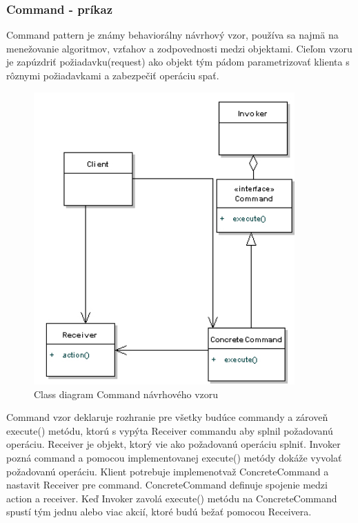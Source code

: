 \subsubsection{Command - príkaz}
\indent Command pattern je známy behaviorálny návrhový vzor, používa sa najmä na menežovanie algoritmov, vzťahov a zodpovednosti medzi objektami. 
Cieľom vzoru je zapúzdriť požiadavku(request) ako objekt tým pádom parametrizovať klienta s rôznymi požiadavkami a zabezpečiť operáciu spať.\cite{designpattern}
\begin{figure}[!htbp]
	\centering
	\includegraphics[width=10cm]{img/command_pattern_class.jpg}
	\caption{Class diagram Command návrhového vzoru}
	\label{fig:test}
\end{figure}
\newline
Command vzor deklaruje rozhranie pre všetky budúce commandy a zároveň execute() metódu, ktorú s vypýta Receiver commandu aby splnil požadovanú operáciu.
Receiver je objekt, ktorý vie ako požadovanú operáciu splniť. Invoker pozná command a pomocou implementovanej execute() metódy dokáže vyvolať požadovanú operáciu.
Klient potrebuje implemenotvaž ConcreteCommand a nastavit Receiver pre command. ConcreteCommand definuje spojenie medzi action a receiver. Keď Invoker zavolá execute() metódu na ConcreteCommand spustí tým jednu alebo viac akcií, ktoré budú bežať pomocou Receivera.\cite{designpattern}


